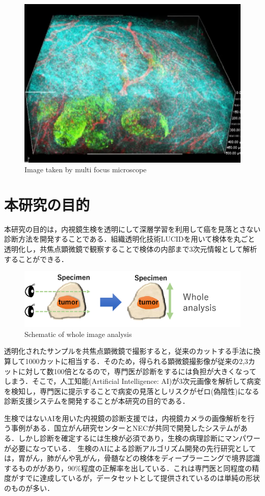 \begin{figure}[H]
	\centering
	\includegraphics[width=0.7\linewidth]{fig/chapter1/microscope}
	\caption{Image taken by multi focus microscope}
	\label{fig:microscope}
\end{figure}


\section{本研究の目的}
本研究の目的は，内視鏡生検を透明にして深層学習を利用して癌を見落とさない診断方法を開発することである．組織透明化技術LUCIDを用いて検体を丸ごと透明化し，共焦点顕微鏡で観察することで検体の内部まで3次元情報として解析することができる．

\begin{figure}[H]
	\centering
	\includegraphics[width=0.7\linewidth]{fig/chapter1/whole_image_analysis}
	\caption{Schematic of whole image analysis}
	\label{fig:wholeimageanalysis}
\end{figure}

透明化されたサンプルを共焦点顕微鏡で撮影すると，従来のカットする手法に換算して1000カットに相当する．そのため，得られる顕微鏡撮影像が従来の2,3カットに対して数100倍となるので，専門医が診断をするには負担が大きくなってしまう．そこで，人工知能(Artificial Intelligence: AI)が3次元画像を解析して病変を検知し，専門医に提示することで病変の見落としリスクがゼロ(偽陰性)になる診断支援システムを開発することが本研究の目的である．


生検ではないAIを用いた内視鏡の診断支援では，内視鏡カメラの画像解析を行う事例がある．国立がん研究センターとNECが共同で開発したシステムがある\cite{要出典}．しかし診断を確定するには生検が必須であり，生検の病理診断にマンパワーが必要になっている．
生検のAIによる診断アルゴリズム開発の先行研究としては，胃がん，肺がんや乳がん，骨髄などの検体をディープラーニングで境界認識するものががあり，90\%程度の正解率を出している\cite{要出典}．これは専門医と同程度の精度がすでに達成しているが，データセットとして提供されているのは単純の形状のものが多い．

